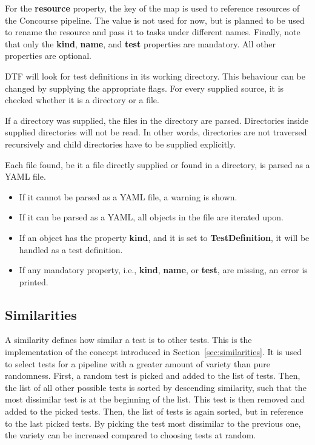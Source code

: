 For the \textbf{resource} property, the key of the map is used to reference resources of the Concourse pipeline.
The value is not used for now, but is planned to be used to rename the resource and pass it to tasks under different names.
Finally, note that only the \textbf{kind}, \textbf{name}, and \textbf{test} properties are mandatory.
All other properties are optional.

DTF will look for test definitions in its working directory.
This behaviour can be changed by supplying the appropriate flags.
For every supplied source, it is checked whether it is a directory or a file.

If a directory was supplied, the files in the directory are parsed.
Directories inside supplied directories will not be read.
In other words, directories are not traversed recursively and child directories have to be supplied explicitly.

Each file found, be it a file directly supplied or found in a directory, is parsed as a YAML file.
\begin{itemize}
  \item If it cannot be parsed as a YAML file, a warning is shown.
  \item If it can be parsed as a YAML, all objects in the file are iterated upon.
  \item If an object has the property \textbf{kind}, and it is set to \textbf{TestDefinition}, it will be handled as a test definition.
  \item If any mandatory property, i.e., \textbf{kind}, \textbf{name}, or \textbf{test}, are missing, an error is printed.
\end{itemize}

\subsection{Similarities}\label{subsec:similarities}

A similarity defines how similar a test is to other tests.
This is the implementation of the concept introduced in Section~\ref{sec:similarities}.
It is used to select tests for a pipeline with a greater amount of variety than pure randomness.
First, a random test is picked and added to the list of tests.
Then, the list of all other possible tests is sorted by descending similarity, such that the most dissimilar test is at the beginning of the list.
This test is then removed and added to the picked tests.
Then, the list of tests is again sorted, but in reference to the last picked tests.
By picking the test most dissimilar to the previous one, the variety can be increased compared to choosing tests at random.

